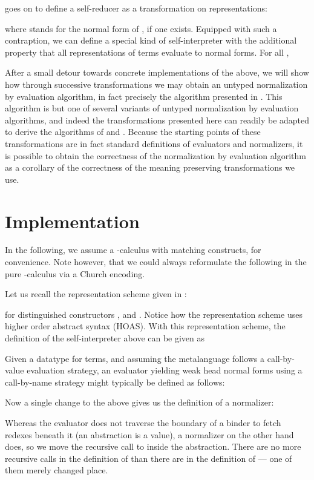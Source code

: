 \documentclass[a4paper]{amsart}
\begin{document}
\citeauthor{mogensen:selfint} goes on to define a self-reducer as a
transformation on representations:

where  stands for the normal form of , if one exists. Equipped with
such a contraption, we can define a special kind of self-interpreter with the
additional property that all representations of terms evaluate to normal
forms. For all ,


After a small detour towards concrete implementations of the above, we will
show how through successive transformations we may obtain an untyped
normalization by evaluation algorithm, in fact precisely the algorithm
presented in \citep{boespflug:efficientnbe}. This algorithm is but one of
several variants of untyped normalization by evaluation algorithms, and indeed
the transformations presented here can readily be adapted to derive the
algorithms of \citet{aehlig:cin} and \citet{filinski:dau}. Because the
starting points of these transformations are in fact standard definitions of
evaluators and normalizers, it is possible to obtain the correctness of the
normalization by evaluation algorithm as a corollary of the correctness of the
meaning preserving transformations we use.

\section{Implementation}

In the following, we assume a -calculus with matching constructs, for
convenience. Note however, that we could always reformulate the following in
the pure -calculus via a Church encoding.

Let us recall the representation scheme given in \citep{mogensen:selfint}:

for distinguished constructors ,  and . Notice how the
representation scheme uses higher order abstract syntax (HOAS). With this
representation scheme, the definition of the  self-interpreter above
can be given as


Given a datatype for terms, and assuming the metalanguage follows a
call-by-value evaluation strategy, an evaluator yielding weak head
normal forms using a call-by-name strategy might typically be defined
as follows:

Now a single change to the above gives us the definition of a normalizer:

Whereas the evaluator does not traverse the boundary of a binder to fetch
redexes beneath it (an abstraction is a value), a normalizer on the other hand
does, so we move the recursive call to  inside the abstraction. There
are no more recursive calls in the definition of  than there are in the
definition of  --- one of them merely changed place.
\end{document}
